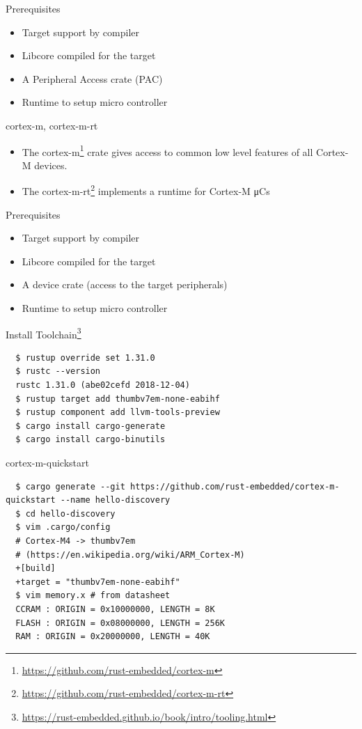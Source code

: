 \documentclass[aspectratio=1610,14pt,t]{beamer}
\begin{document}
\begin{frame}[c]{Prerequisites}
  \begin{itemize}
    \item \CheckedBox Target support by compiler
    \item \CheckedBox Libcore compiled for the target
    \item \CheckedBox A Peripheral Access crate (PAC)
    \item \Square Runtime to setup micro controller
  \end{itemize}
\end{frame}

\begin{frame}[c]{cortex-m, cortex-m-rt}
  \begin{itemize}
    \item The cortex-m\footnote{\url{https://github.com/rust-embedded/cortex-m}} crate gives access to common low level features of all Cortex-M devices.
    \item The cortex-m-rt\footnote{\url{https://github.com/rust-embedded/cortex-m-rt}} implements a runtime for Cortex-M μCs
  \end{itemize}
\end{frame}

\begin{frame}[c]{Prerequisites}
  \begin{itemize}
    \item \CheckedBox Target support by compiler
    \item \CheckedBox Libcore compiled for the target
    \item \CheckedBox A device crate (access to the target peripherals)
    \item \CheckedBox Runtime to setup micro controller
  \end{itemize}
\end{frame}

\begin{frame}[c,fragile]{Install Toolchain\footnote{\url{https://rust-embedded.github.io/book/intro/tooling.html}}}
  \begin{verbatim}
  $ rustup override set 1.31.0
  $ rustc --version
  rustc 1.31.0 (abe02cefd 2018-12-04)
  $ rustup target add thumbv7em-none-eabihf
  $ rustup component add llvm-tools-preview
  $ cargo install cargo-generate
  $ cargo install cargo-binutils
  \end{verbatim}
\end{frame}

\begin{frame}[c,fragile]{cortex-m-quickstart}
  \begin{verbatim}
  $ cargo generate --git https://github.com/rust-embedded/cortex-m-quickstart --name hello-discovery
  $ cd hello-discovery
  $ vim .cargo/config
  # Cortex-M4 -> thumbv7em
  # (https://en.wikipedia.org/wiki/ARM_Cortex-M)
  +[build]
  +target = "thumbv7em-none-eabihf"
  $ vim memory.x # from datasheet
  CCRAM : ORIGIN = 0x10000000, LENGTH = 8K
  FLASH : ORIGIN = 0x08000000, LENGTH = 256K
  RAM : ORIGIN = 0x20000000, LENGTH = 40K
  \end{verbatim}
\end{frame}
\end{document}
